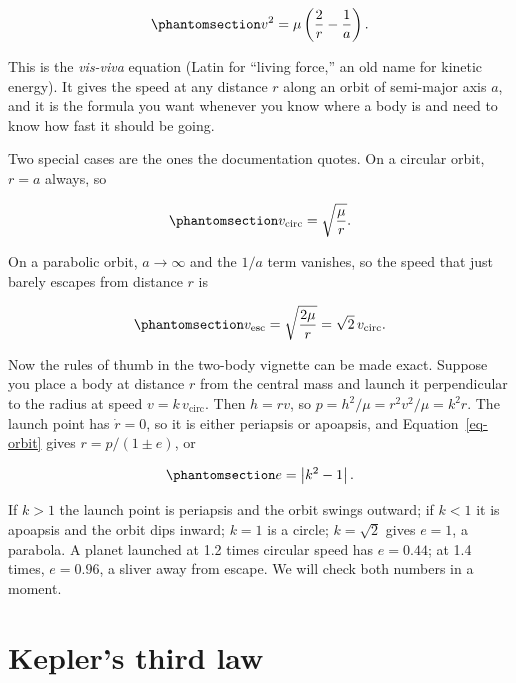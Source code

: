 \documentclass[
  10.5pt,
  letterpaper,
]{scrbook}
\theoremstyle{plain}
\theoremstyle{remark}
\begin{document}
\begin{equation}\protect\phantomsection\label{eq-vis-viva}{
v^2 = \mu\left(\frac{2}{r} - \frac{1}{a}\right).
}\end{equation}

This is the \emph{vis-viva} equation (Latin for ``living force,'' an old
name for kinetic energy). It gives the speed at any distance \(r\) along
an orbit of semi-major axis \(a\), and it is the formula you want
whenever you know where a body is and need to know how fast it should be
going.

Two special cases are the ones the documentation quotes. On a circular
orbit, \(r = a\) always, so

\begin{equation}\protect\phantomsection\label{eq-v-circ}{
v_{\mathrm{circ}} = \sqrt{\frac{\mu}{r}}.
}\end{equation}

On a parabolic orbit, \(a \to \infty\) and the \(1/a\) term vanishes, so
the speed that just barely escapes from distance \(r\) is

\begin{equation}\protect\phantomsection\label{eq-v-esc}{
v_{\mathrm{esc}} = \sqrt{\frac{2\mu}{r}} = \sqrt{2}\,v_{\mathrm{circ}}.
}\end{equation}

Now the rules of thumb in the two-body vignette can be made exact.
Suppose you place a body at distance \(r\) from the central mass and
launch it perpendicular to the radius at speed
\(v = k\,v_{\mathrm{circ}}\). Then \(h = rv\), so
\(p = h^2/\mu = r^2v^2/\mu = k^2 r\). The launch point has
\(\dot{r} = 0\), so it is either periapsis or apoapsis, and
Equation~\ref{eq-orbit} gives \(r = p/(1\pm e)\), or

\begin{equation}\protect\phantomsection\label{eq-e-from-k}{
e = \left|k^2 - 1\right|.
}\end{equation}

If \(k > 1\) the launch point is periapsis and the orbit swings outward;
if \(k < 1\) it is apoapsis and the orbit dips inward; \(k = 1\) is a
circle; \(k = \sqrt{2}\) gives \(e = 1\), a parabola. A planet launched
at 1.2 times circular speed has \(e = 0.44\); at 1.4 times,
\(e = 0.96\), a sliver away from escape. We will check both numbers in a
moment.

\section{Kepler's third law}\label{keplers-third-law}
\end{document}
